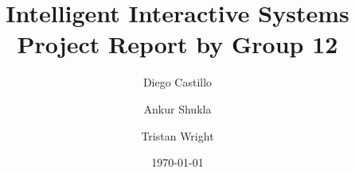 \documentclass[a4paper]{article}
\title{Intelligent Interactive Systems \\ Project Report by Group 12}
\author{Diego Castillo \and Ankur Shukla \and Tristan Wright }
\date{\today}
\begin{document}
\maketitle








\begin{appendix}

\end{appendix}



\end{document}
